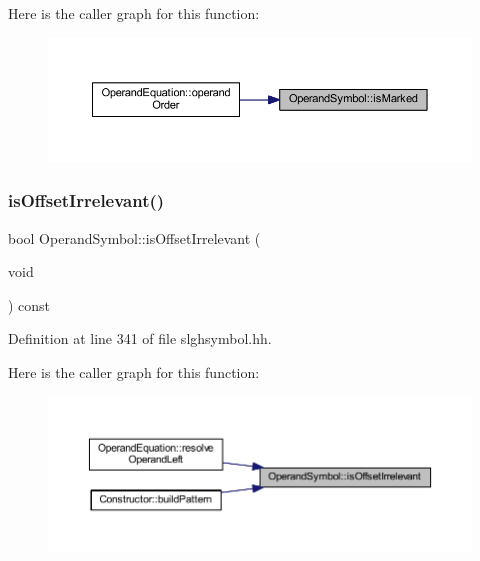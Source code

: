 Here is the caller graph for this function\+:
\nopagebreak
\begin{figure}[H]
\begin{center}
\leavevmode
\includegraphics[width=350pt]{class_operand_symbol_a284c4038e0c1de1edee67f872b7debc9_icgraph}
\end{center}
\end{figure}
\mbox{\label{class_operand_symbol_aaabb092dd61abe21c855a35443397809}} 
\subsubsection{\texorpdfstring{isOffsetIrrelevant()}{isOffsetIrrelevant()}}
{\footnotesize\ttfamily bool Operand\+Symbol\+::is\+Offset\+Irrelevant (\begin{DoxyParamCaption}\item[{void}]{ }\end{DoxyParamCaption}) const\hspace{0.3cm}{\ttfamily [inline]}}



Definition at line 341 of file slghsymbol.\+hh.

Here is the caller graph for this function\+:
\nopagebreak
\begin{figure}[H]
\begin{center}
\leavevmode
\includegraphics[width=350pt]{class_operand_symbol_aaabb092dd61abe21c855a35443397809_icgraph}
\end{center}
\end{figure}
\mbox{\label{class_operand_symbol_a6aae865579741ebe784ba0782c0192ec}} 
